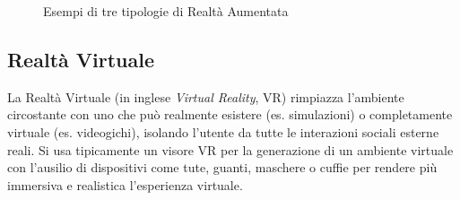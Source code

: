 \begin{figure}
    \centering
    \caption{Esempi di tre tipologie di Realtà Aumentata} 
    \label{fig:ARbased_type}
\end{figure}

\subsection{Realtà Virtuale}
\label{sec:vr}
La Realtà Virtuale (in inglese \textit{Virtual Reality}, VR) rimpiazza l'ambiente circostante con uno che può realmente esistere (es. simulazioni) o completamente virtuale (es. videogichi), isolando l'utente da tutte le interazioni sociali esterne reali. Si usa tipicamente un visore VR per la generazione di un ambiente virtuale con l'ausilio di dispositivi come tute, guanti, maschere o cuffie per rendere più immersiva e realistica l'esperienza virtuale.

